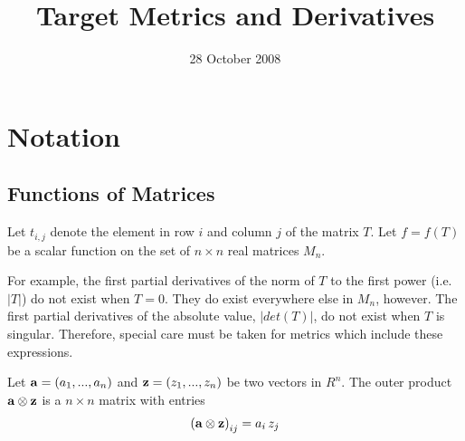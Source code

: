 \documentclass{report}
\title{ Target Metrics and Derivatives }
\date{28 October 2008}
\begin{document}
\maketitle

\tableofcontents

\chapter{Notation}

\section{Functions of Matrices}

Let $t_{i,j}$ denote the element in row $i$ and column $j$ of the matrix $T$.
Let $f=f(T)$ be a scalar function on the set of $n \times n$ real matrices 
$M_n$. \newline

 For example, the first partial
derivatives of the norm of $T$ to the first power (i.e. $|T|$) do not exist 
when $T=0$. 
They do exist everywhere else in $M_n$, however.  The first partial 
derivatives of 
the absolute value, $|det(T)|$, do not exist when $T$ is singular. Therefore,
special care must be taken for metrics which include these expressions. 
\newline

 \newline
Let ${\bf a}=(a_1,...,a_n)$ and ${\bf z}=(z_1,...,z_n)$ be two vectors in 
$R^n$.  The outer product ${\bf a} \otimes {\bf z}$ is a $n \times n$ matrix 
with entries
\begin{eqnarray}
\left( {\bf a} \otimes {\bf z} \right)_{ij} = a_i \, z_j
\end{eqnarray}
\end{document}

